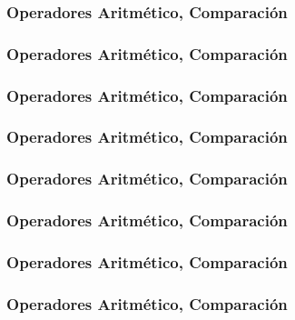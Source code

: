 \documentclass{beamer}
\begin{document}
\begin{frame}
\frametitle{Operadores Aritmético, Comparación}

\end{frame}

\begin{frame}
\frametitle{Operadores Aritmético, Comparación}

\end{frame}

\begin{frame}
\frametitle{Operadores Aritmético, Comparación}

\end{frame}

\begin{frame}
\frametitle{Operadores Aritmético, Comparación}

\end{frame}

\begin{frame}
\frametitle{Operadores Aritmético, Comparación}

\end{frame}

\begin{frame}
\frametitle{Operadores Aritmético, Comparación}

\end{frame}

\begin{frame}
\frametitle{Operadores Aritmético, Comparación}

\end{frame}

\begin{frame}
\frametitle{Operadores Aritmético, Comparación}

\end{frame}
\end{document}
